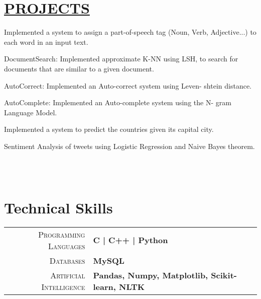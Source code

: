\documentclass[]{deedy-resume-openfont}
\begin{document}
\hfill
\begin{minipage}[t]{0.66\textwidth} 



\section{\href{https://github.com/SPOOKBITE/NLP_PROJECTS}{PROJECTS}}

\vspace{\topsep} %
\begin{tightemize}
\item Implemented a system to assign a part-of-speech tag (Noun, Verb, Adjective...) to each word in an input text.
\item DocumentSearch: Implemented approximate K-NN using LSH, to
search for documents that are similar to a given document.
\item AutoCorrect: Implemented an Auto-correct system using Leven-
shtein distance.
\item AutoComplete: Implemented an Auto-complete system using the N-
gram Language Model.
\item Implemented a system to predict the countries given its capital city.
\item Sentiment Analysis of tweets using Logistic Regression and Naive Bayes theorem.
\end{tightemize}


\\~\\



\section{Technical Skills}
\begin{tabular}{r|p{15cm}}
\textsc{Programming Languages} & \textbf{ C | C++ | Python } \\
\textsc{Databases} & \textbf{ MySQL }\\
\textsc{Artificial Intelligence} & \textbf{Pandas, Numpy, Matplotlib, Scikit-learn, NLTK}\\ 
\end{tabular}

\\~\\


\end{minipage}
\end{document}
